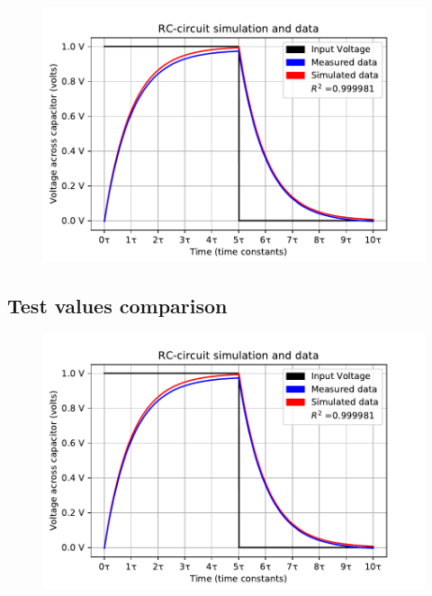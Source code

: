 \begin{figure}
\center
\includegraphics[scale=1]{fig/img/eks_1}
\end{figure}

\subsection{Test values comparison}
\begin{figure}[H]
 \includegraphics{fig/img/eks_1.pdf}
 \end{figure}

